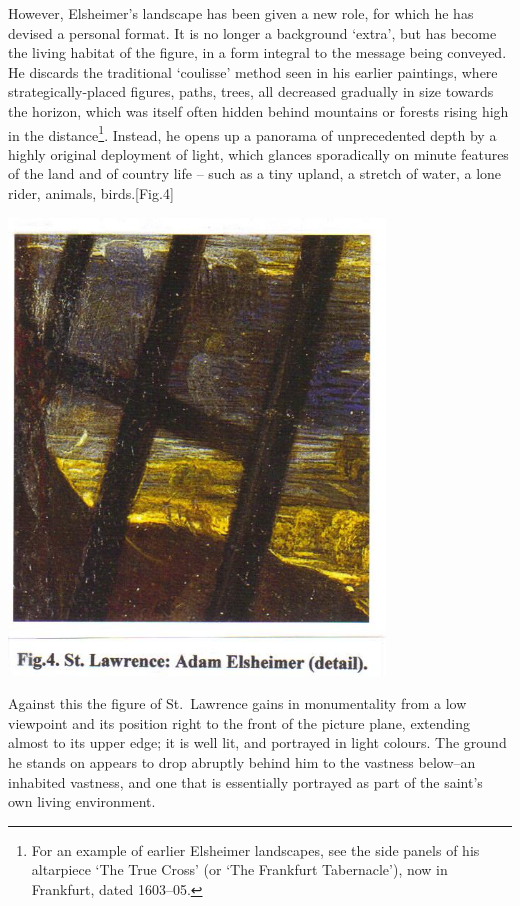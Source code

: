 \documentclass[a4paper,12pt]{article}
\begin{document}
However, Elsheimer's landscape has been given a new role, for which he
has devised a personal format.  It is no longer a background `extra',
but has become the living habitat of the figure, in a form integral to
the message being conveyed.  He discards the traditional `coulisse'
method seen in his earlier paintings, where strategically-placed
figures, paths, trees, all decreased gradually in size towards the
horizon, which was itself often hidden behind mountains or forests
rising high in the distance\footnote{For an example of earlier
  Elsheimer landscapes, see the side panels of his altarpiece `The
  True Cross' (or `The Frankfurt Tabernacle'), now in Frankfurt, dated
  1603--05.}. Instead, he opens up a panorama of unprecedented depth by
a highly original deployment of light, which glances sporadically on
minute features of the land and of country life – such as a tiny
upland, a stretch of water, a lone rider, animals, birds.[Fig.4]
\begin{center}
\includegraphics[width=10cm]{fig4.jpg}
\end{center}
Against this the figure of St.~Lawrence gains in monumentality from a
low viewpoint and its position right to the front of the picture
plane, extending almost to its upper edge; it is well lit, and
portrayed in light colours. The ground he stands on appears to drop
abruptly behind him to the vastness below--an inhabited vastness, and
one that is essentially portrayed as part of the saint's own living
environment.
\end{document}

